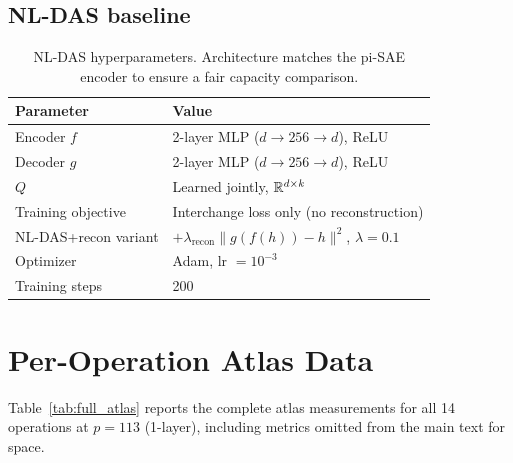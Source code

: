 \subsection{NL-DAS baseline}

\begin{table}[H]
\centering
\small
\begin{tabular}{ll}
\toprule
\textbf{Parameter} & \textbf{Value} \\
\midrule
Encoder $f$ & 2-layer MLP ($d \to 256 \to d$), ReLU \\
Decoder $g$ & 2-layer MLP ($d \to 256 \to d$), ReLU \\
$Q$ & Learned jointly, $\mathbb{R}^{d \times k}$ \\
Training objective & Interchange loss only (no reconstruction) \\
NL-DAS+recon variant & $+ \lambda_\text{recon} \|g(f(h)) - h\|^2$, $\lambda = 0.1$ \\
Optimizer & Adam, lr $= 10^{-3}$ \\
Training steps & 200 \\
\bottomrule
\end{tabular}
\caption{NL-DAS hyperparameters. Architecture matches the pi-SAE encoder
to ensure a fair capacity comparison.}
\label{tab:hp_nldas}
\end{table}


\section{Per-Operation Atlas Data}
\label{app:atlas_data}

Table~\ref{tab:full_atlas} reports the complete atlas measurements for all
14 operations at $p = 113$ (1-layer), including metrics omitted from the
main text for space.

